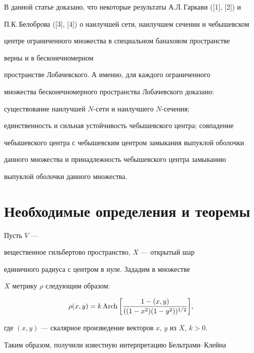 \label{begin}








В данной статье доказано, что некоторые результаты А.Л.\,Гаркави ([1], [2]) и


П.К.\,Белоброва ([3], [4]) о наилучшей сети, наилучшем сечении и чебышевском


центре ограниченного множества в специальном банаховом пространстве


верны и в бесконечномерном


пространстве Лобачевского. А именно, для каждого ограниченного


множества бесконечномерного пространства Лобачевского доказано: 


существование наилучшей $N$-сети и наилучшего $N$-сечения; 


единственность и сильная устойчивость чебышевского центра; совпадение


чебышевского центра с чебышевским центром замыкания выпуклой оболочки


данного множества и принадлежность чебышевского центра замыканию


выпуклой оболочки данного множества.


 


\section{Необходимые определения и теоремы}





Пусть $V$ ---


вещественное гильбертово пространство, $X$ --- открытый шар


единичного радиуса с центром в нуле. Зададим в множестве


$X$ метрику $\rho$ следующим образом:


\begin{equation}


\rho (x,y)= k \Arch \bigg[\frac{1-(x,y)}{((1 -x^{2})(1-y^{2}))^{1/2}}\bigg],


\end{equation}


где $(x,y)$ --- скалярное произведение векторов $x$, $y$ из $X$, $k > 0$.


Таким образом, получили известную интерпретацию Бельтрами--Клейна


